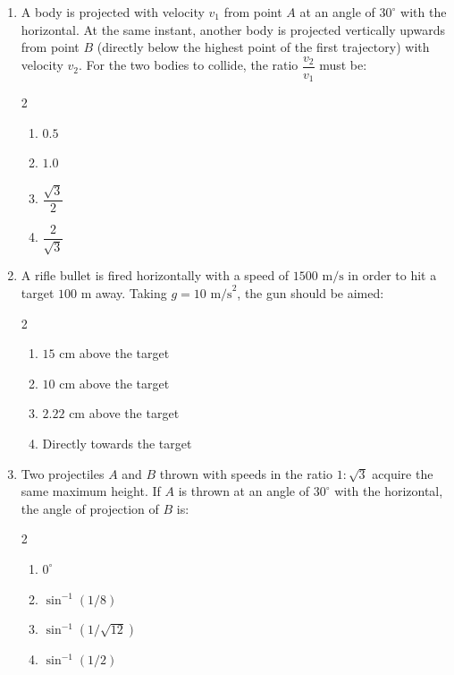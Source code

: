 \documentclass[11pt,a4paper]{article}
\begin{document}
\begin{enumerate}[label=\textbf{\textcolor{l2Amber}{Q\arabic*.}},leftmargin=24pt,itemsep=10pt,start=26]
  \item A body is projected with velocity $v_1$ from point $A$ at an angle of $30^\circ$ with the horizontal. At the same instant, another body is projected vertically upwards from point $B$ (directly below the highest point of the first trajectory) with velocity $v_2$. For the two bodies to collide, the ratio $\dfrac{v_2}{v_1}$ must be:
  \begin{multicols}{2}
  \begin{enumerate}[label=\textbf{\textcolor{primaryDark}{(\Alph*)}},itemsep=2pt]
    \item $0.5$
    \item $1.0$
    \item $\dfrac{\sqrt{3}}{2}$
    \item $\dfrac{2}{\sqrt{3}}$
  \end{enumerate}
  \end{multicols}

  \item A rifle bullet is fired horizontally with a speed of $1500\text{ m/s}$ in order to hit a target $100\text{ m}$ away. Taking $g = 10\text{ m/s}^2$, the gun should be aimed:
  \begin{multicols}{2}
  \begin{enumerate}[label=\textbf{\textcolor{primaryDark}{(\Alph*)}},itemsep=2pt]
    \item $15\text{ cm}$ above the target
    \item $10\text{ cm}$ above the target
    \item $2.22\text{ cm}$ above the target
    \item Directly towards the target
  \end{enumerate}
  \end{multicols}

  \item Two projectiles $A$ and $B$ thrown with speeds in the ratio $1 : \sqrt{3}$ acquire the same maximum height. If $A$ is thrown at an angle of $30^\circ$ with the horizontal, the angle of projection of $B$ is:
  \begin{multicols}{2}
  \begin{enumerate}[label=\textbf{\textcolor{primaryDark}{(\Alph*)}},itemsep=2pt]
    \item $0^\circ$
    \item $\sin^{-1}(1/8)$
    \item $\sin^{-1}(1/\sqrt{12})$
    \item $\sin^{-1}(1/2)$
  \end{enumerate}
  \end{multicols}


\end{enumerate}
\end{document}
